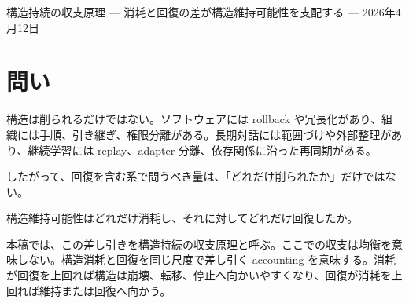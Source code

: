 \documentclass[12pt,a4paper]{article}
\begin{document}
\PaperTitleBlock
  {構造持続の収支原理}
  {— 消耗と回復の差が構造維持可能性を支配する —}
  {2026年4月12日}

\begin{abstract}
構造持続の最小形式は、回復を明示しない収縮モードとして

\[
S = M e^{-L}
\]

を与える。ここで \(L\) は、構造維持可能な状態集合がどれだけ縮小したかを対数比で測った累積構造消耗量である。

本稿は、この最小核を、回復・修復・冗長化・外部支援・ロールバックを含む形式へ拡張する。各時点の構造消耗量を \(d_{t}\)、回復量を \(r_{t}\) とし、その差

\[
b_{t} := d_{t}-r_{t}
\]

を純消耗量と呼ぶ。有限時間地平 \(n\) までの累積純消耗量を

\[
B_{n} := \sum_{t<n} b_{t}
\]

と置けば、構造維持可能領域の質量は

\[
m(V^{(n)}) = m(V^{(0)}) e^{-B_{n}}
\]

と書ける。有効維持余力を明示する読者向けの形式では

\[
S_{n} = M_{n} e^{-B_{n}}
\]

である。

この式は、構造持続の最小核 \(S=Me^{-L}\) を置き換えるものではない。回復量がない場合、すなわち \(r_{t}=0\) の場合には \(B_{n}=L_{n}\) となり、最小形式に戻る。本稿の中心主張は、回復を含む系では、構造持続を決めるのは消耗量そのものではなく、消耗量と回復量の差である、という一点にある。

本稿の意義は、回復を含む系でも指数核は失われず、消耗量ではなく累積純消耗量 \(B\) が構造維持可能性を支配することを示す点にある。
\end{abstract}

\section{問い}\label{ux554fux3044}

構造は削られるだけではない。ソフトウェアには rollback や冗長化があり、組織には手順、引き継ぎ、権限分離がある。長期対話には範囲づけや外部整理があり、継続学習には replay、adapter 分離、依存関係に沿った再同期がある。

したがって、回復を含む系で問うべき量は、「どれだけ削られたか」だけではない。

構造維持可能性はどれだけ消耗し、それに対してどれだけ回復したか。

本稿では、この差し引きを構造持続の収支原理と呼ぶ。ここでの収支は均衡を意味しない。構造消耗と回復を同じ尺度で差し引く accounting を意味する。消耗が回復を上回れば構造は崩壊、転移、停止へ向かいやすくなり、回復が消耗を上回れば維持または回復へ向かう。
\end{document}
